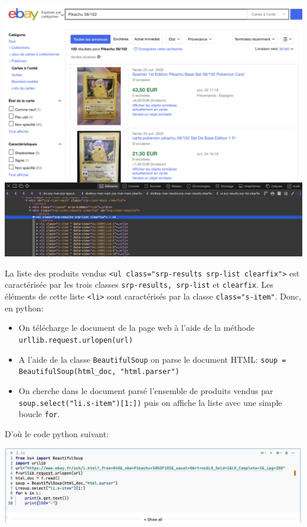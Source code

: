 \documentclass[a4paper]{article}
\begin{document}
\begin{center}
\includegraphics[scale=0.3]{ebay3.png} 
\end{center}

La liste des produits vendus {\tt <ul class="srp-results srp-list clearfix">}  est caractérisée par les trois classes {\tt srp-results, srp-list} et  {\tt clearfix}. Les éléments de cette liste {\tt <li>} sont caractérisés par la classe {\tt class="s-item"}. Donc, en python:
\begin{itemize}
\item On télécharge le document de la page web à l'aide de la méthode {\tt urllib.request.urlopen(url)}
\item A l'aide de la classe {\tt BeautifulSoup} on parse le document HTML: {\tt soup = BeautifulSoup(html\_doc, "html.parser")}
\item On cherche dans le document parsé l'ensemble de produits vendus par {\tt soup.select("li.s-item")[1:])} puis on affiche la liste avec une simple boucle {\tt for}.

\end{itemize}

 D'où le code python suivant:

\begin{center}
\includegraphics[scale=0.45]{pgm3.png} 
\end{center}
\end{document}
